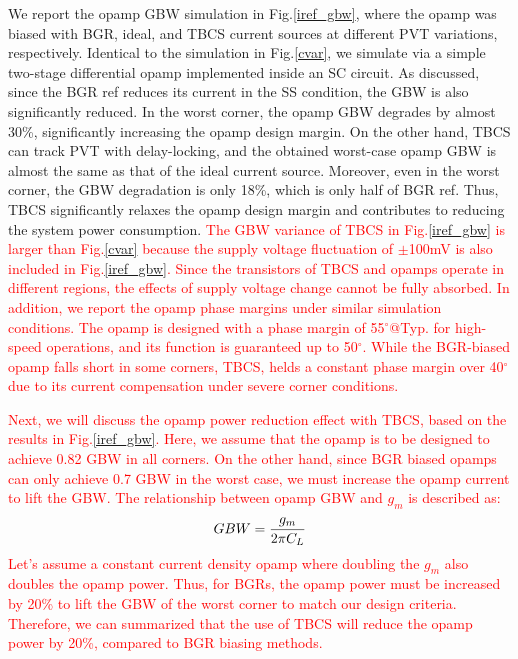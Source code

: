 \documentclass[paper]{ieice}
\begin{document}
We report the opamp GBW simulation in Fig.\ref{iref_gbw}, where the opamp was biased with BGR, ideal, and TBCS current sources at different PVT variations, respectively. Identical to the simulation in Fig.\ref{cvar}, we simulate via a simple two-stage differential opamp implemented inside an SC circuit.
As discussed, since the BGR ref reduces its current in the SS condition, the GBW is also significantly reduced. In the worst corner, the opamp GBW degrades by almost 30\%, significantly increasing the opamp design margin.
On the other hand, TBCS can track PVT with delay-locking, and the obtained worst-case opamp GBW is almost the same as that of the ideal current source. Moreover, even in the worst corner, the GBW degradation is only 18\%, which is only half of BGR ref. Thus, TBCS significantly relaxes the opamp design margin and contributes to reducing the system power consumption.
\textcolor{red}{The GBW variance of TBCS in Fig.\ref{iref_gbw} is larger than Fig.\ref{cvar} because the supply voltage fluctuation of $\pm$100mV is also included in Fig.\ref{iref_gbw}. Since the transistors of TBCS and opamps operate in different regions, the effects of supply voltage change cannot be fully absorbed.
In addition, we report the opamp phase margins under similar simulation conditions. The opamp is designed with a phase margin of 55$^\circ$@Typ. for high-speed operations, and its function is guaranteed up to 50$^\circ$. While the BGR-biased opamp falls short in some corners, TBCS, helds a constant phase margin over 40$^\circ$ due to its current compensation under severe corner conditions.}

\textcolor{red}{Next, we will discuss the opamp power reduction effect with TBCS, based on the results in Fig.\ref{iref_gbw}. Here, we assume that the opamp is to be designed to achieve 0.82 GBW in all corners. On the other hand, since BGR biased opamps can only achieve 0.7 GBW in the worst case, we must increase the opamp current to lift the GBW. The relationship between opamp GBW and $g_m$ is described as:
\begin{eqnarray}
    \centering
    GBW = \frac{g_m}{2 \pi C_L}
\end{eqnarray}
Let's assume a constant current density opamp where doubling the $g_m$ also doubles the opamp power. Thus, for BGRs, the opamp power must be increased by 20\% to lift the GBW of the worst corner to match our design criteria. Therefore, we can summarized that the use of TBCS will reduce the opamp power by 20\%, compared to BGR biasing methods.}
\end{document}

